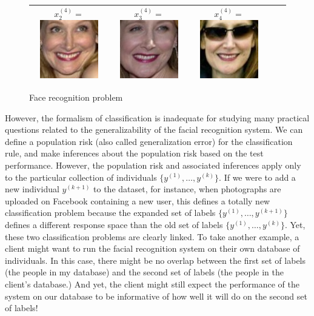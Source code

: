 \begin{figure}
\begin{tabular}{|c|ccc|c|}
  $x_2^{(4)} = $\includegraphics[scale = 0.2]{../../proposal/face_photos/Patricia_Clarkson_0002.png} &  
  $x_3^{(4)} = $\includegraphics[scale = 0.2]{../../proposal/face_photos/Patricia_Clarkson_0003.png} &  
  $x_4^{(4)} = $\includegraphics[scale = 0.2]{../../proposal/face_photos/Patricia_Clarkson_0004.png} \\ \hline
\end{tabular}
\caption{Face recognition problem}
\label{fig:face_rec}
\end{figure}

However, the formalism of classification is inadequate for studying
many practical questions related to the generalizability of the facial
recognition system.  We can define a population risk (also called
generalization error) for the classification rule, and make inferences
about the population risk based on the test performance.  However, the
population risk and associated inferences apply only to the particular
collection of individuals $\{y^{(1)},\hdots, y^{(k)}\}$.  If we were
to add a new individual $y^{(k+1)}$ to the dataset, for instance, when
photographs are uploaded on Facebook containing a new user, this
defines a totally new classification problem because the expanded set
of labels $\{y^{(1)},\hdots, y^{(k+1)}\}$ defines a different response
space than the old set of labels $\{y^{(1)},\hdots, y^{(k)}\}$.  Yet,
these two classification problems are clearly linked.  To take another
example, a client might want to run the facial recognition system on
their own database of individuals.  In this case, there might be no
overlap between the first set of labels (the people in my database)
and the second set of labels (the people in the client's database.)
And yet, the client might still expect the performance of the system
on our database to be informative of how well it will do on the second
set of labels!

